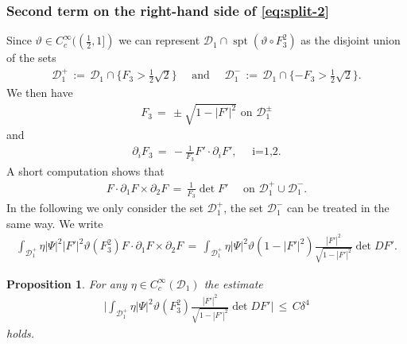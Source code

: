 \documentclass[reqno,makeidx,12pt]{amsart}
\theoremstyle{note}
\newtheorem{proposition}{Proposition}
\theoremstyle{definition}
\begin{document}
\subsubsection{Second term on the right-hand side of \eqref{eq:split-2}}
Since ${\vartheta}\in C^\infty_c((\frac{1}{2},1])$ we can represent ${\mathcal{D}}_1\cap \operatorname{spt}({\vartheta}\circ F_3^2)$ as the disjoint union of the sets
\begin{align*}
	{\mathcal{D}}_1^+ \,:=\, {\mathcal{D}}_1\cap \{F_3>\frac{1}{2}\sqrt{2}\} \quad\text{ and }\quad{\mathcal{D}}_1^- \,:=\, {\mathcal{D}}_1\cap \{-F_3>\frac{1}{2}\sqrt{2}\}.
\end{align*}
We then have
\begin{gather*}
	F_3\,=\, \pm \sqrt{1-|F'|^2} \text{ on } {\mathcal{D}}_1^\pm
\end{gather*}
and
\begin{gather*}
	\partial_i F_3\,=\, -\frac{1}{F_3} F'\cdot\partial_i F',\quad\text{ i=1,2.}
\end{gather*}
A short computation shows that
\begin{gather}
	F\cdot \partial_1 F\times \partial_2 F \,=\, \frac{1}{F_3}\det F'\quad\text{ on } {\mathcal{D}}_1^+\cup {\mathcal{D}}_1^-. \label{eq:64bis}
\end{gather}
In the following we only consider the set ${\mathcal{D}}_1^+$, the set ${\mathcal{D}}_1^-$ can be treated in the same way. We write
\begin{gather*}
	\int_{{\mathcal{D}}_1^+}\eta |\Psi|^2 |F'|^2  {\vartheta}(F_3^2) F\cdot\partial_1 F \times \partial_2 F\,=\, \int_{{\mathcal{D}}_1^+} \eta |\Psi|^2  {\vartheta}(1-|F'|^2)\frac{|F'|^2}{\sqrt{1-|F'|^2}}\det DF'. \end{gather*}
\begin{proposition}\label{prop:6}
For any $\eta\in C^\infty_c({\mathcal{D}}_1)$ the estimate
\begin{align*}
	\Big| \int_{{\mathcal{D}}_1^+}  \eta |\Psi|^2 {\vartheta}(F_3^2)\frac{|F'|^2}{\sqrt{1-|F'|^2}} \det DF'\Big| \,\leq\,  C \delta^4
\end{align*}
holds.
\end{proposition}
\end{document}
